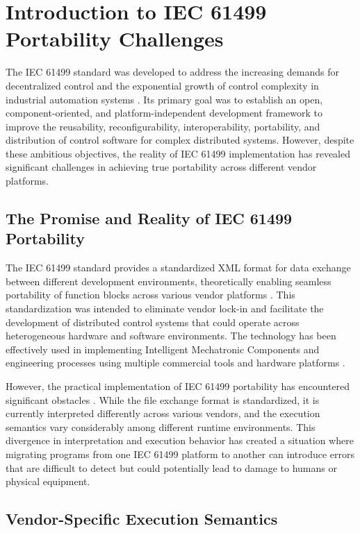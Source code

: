 
\section{Introduction to IEC 61499 Portability Challenges}

The IEC 61499 standard was developed to address the increasing demands for decentralized control and the exponential growth of control complexity in industrial automation systems \cite{vyatkin2011iec}. Its primary goal was to establish an open, component-oriented, and platform-independent development framework to improve the reusability, reconfigurability, interoperability, portability, and distribution of control software for complex distributed systems. However, despite these ambitious objectives, the reality of IEC 61499 implementation has revealed significant challenges in achieving true portability across different vendor platforms.

\subsection{The Promise and Reality of IEC 61499 Portability}

The IEC 61499 standard provides a standardized XML format for data exchange between different development environments, theoretically enabling seamless portability of function blocks across various vendor platforms \cite{iec61499part12012}. This standardization was intended to eliminate vendor lock-in and facilitate the development of distributed control systems that could operate across heterogeneous hardware and software environments. The technology has been effectively used in implementing Intelligent Mechatronic Components and engineering processes using multiple commercial tools and hardware platforms \cite{patil2013composition}.

However, the practical implementation of IEC 61499 portability has encountered significant obstacles \cite{gerber2010does}. While the file exchange format is standardized, it is currently interpreted differently across various vendors, and the execution semantics vary considerably among different runtime environments. This divergence in interpretation and execution behavior has created a situation where migrating programs from one IEC 61499 platform to another can introduce errors that are difficult to detect but could potentially lead to damage to humans or physical equipment.

\subsection{Vendor-Specific Execution Semantics}

